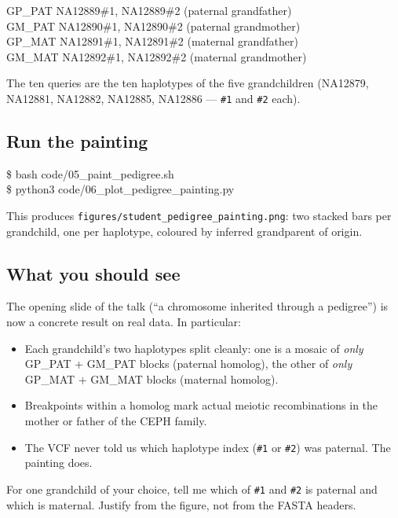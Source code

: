 \documentclass[11pt]{article}
\begin{document}
\begin{cmd}
GP\_PAT  NA12889\#1, NA12889\#2  (paternal grandfather) \\
GM\_PAT  NA12890\#1, NA12890\#2  (paternal grandmother) \\
GP\_MAT  NA12891\#1, NA12891\#2  (maternal grandfather) \\
GM\_MAT  NA12892\#1, NA12892\#2  (maternal grandmother)
\end{cmd}

The ten queries are the ten haplotypes of the five grandchildren
(NA12879, NA12881, NA12882, NA12885, NA12886 --- \texttt{\#1} and
\texttt{\#2} each).

\subsection*{Run the painting}

\begin{cmd}
\$ bash code/05\_paint\_pedigree.sh \\
\$ python3 code/06\_plot\_pedigree\_painting.py
\end{cmd}

This produces \texttt{figures/student\_pedigree\_painting.png}: two
stacked bars per grandchild, one per haplotype, coloured by inferred
grandparent of origin.

\subsection*{What you should see}

The opening slide of the talk (``a chromosome inherited through a
pedigree'') is now a concrete result on real data. In particular:

\begin{itemize}\setlength{\itemsep}{0.2em}
  \item Each grandchild's two haplotypes split cleanly: one is a mosaic
    of \emph{only} GP\_PAT + GM\_PAT blocks (paternal homolog), the
    other of \emph{only} GP\_MAT + GM\_MAT blocks (maternal homolog).
  \item Breakpoints within a homolog mark actual meiotic recombinations
    in the mother or father of the CEPH family.
  \item The VCF never told us which haplotype index (\texttt{\#1} or
    \texttt{\#2}) was paternal. The painting does.
\end{itemize}

\begin{quest}[4.1]
For one grandchild of your choice, tell me which of
\texttt{\#1} and \texttt{\#2} is paternal and which is maternal. Justify
from the figure, not from the FASTA headers.
\end{quest}
\end{document}
